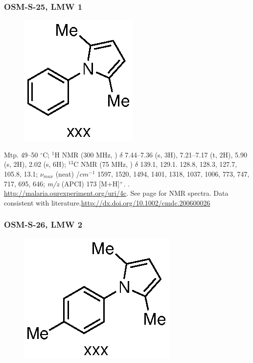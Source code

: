 \documentclass[12pt, a4paper,titlepage]{article}
\begin{document}
\subsubsection*{OSM-S-25, LMW 1}
\label{exp:LMW1}
	\begin{figure}[H]
	\begin{center}
	\includegraphics{exp/LMW1.eps}
	\end{center}
	\vspace{-25pt}	
	\end{figure}	

Mtp. 49--50 $^\circ$C;
$^1$H NMR (300 MHz, ) $\delta$ 7.44--7.36 (s, 3H), 7.21--7.17 (t, 2H), 5.90 (s, 2H), 2.02 (s, 6H); 
$^{13}$C NMR (75 MHz, ) $\delta$ 139.1, 129.1. 128.8, 128.3, 127.7, 105.8, 13.1;
 $\nu_{max}$ (neat) /$cm^{-1}$ 1597, 1520, 1494, 1401, 1318, 1037, 1006, 773, 747, 717, 695, 646;
\emph{m/z} (APCI) 173 [M+H]$^+$.
.
\url{http://malaria.ourexperiment.org/uri/4c}.
 See page \pageref{spec:LMW1} for NMR spectra. Data consistent with literature.\url{http://dx.doi.org/10.1002/cmdc.200600026}

\subsubsection*{OSM-S-26, LMW 2}
\label{exp:LMW2}
	\begin{figure}[H]
	\begin{center}
	\includegraphics{exp/LMW2.eps}
	\end{center}
	\vspace{-25pt}	
	\end{figure}	
\end{document}
